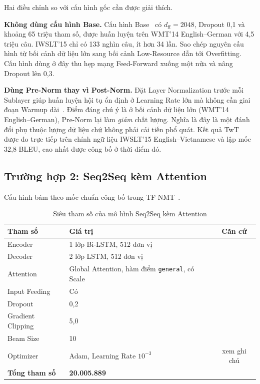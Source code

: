 \documentclass[11pt,a4paper]{article}
\newcommand{\file}[1]{\texttt{\small #1}}
\begin{document}
Hai điều chỉnh so với cấu hình gốc cần được giải thích.

\textbf{Không dùng cấu hình Base.} Cấu hình Base~\cite{vaswani2017} có
$d_{\text{ff}} = 2048$, Dropout 0,1 và khoảng 65 triệu tham số, được huấn luyện
trên WMT'14 English--German với 4,5 triệu câu. IWSLT'15 chỉ có 133 nghìn câu, ít
hơn 34 lần. Sao chép nguyên cấu hình từ bối cảnh dữ liệu lớn sang bối cảnh
Low-Resource dẫn tới Overfitting. Cấu hình dùng ở đây thu hẹp mạng Feed-Forward
xuống một nửa và nâng Dropout lên 0,3.

\textbf{Dùng Pre-Norm thay vì Post-Norm.} Đặt Layer Normalization trước mỗi
Sublayer giúp huấn luyện hội tụ ổn định ở Learning Rate lớn mà không cần giai
đoạn Warmup dài~\cite{nguyen2019}. Điểm đáng chú ý là ở bối cảnh dữ liệu lớn
(WMT'14 English--German), Pre-Norm lại làm \emph{giảm} chất lượng. Nghĩa là đây
là một đánh đổi phụ thuộc lượng dữ liệu chứ không phải cải tiến phổ quát. Kết
quả TwT~\cite{nguyen2019} được đo trực tiếp trên chính ngữ liệu IWSLT'15
English--Vietnamese và lập mốc 32,8 BLEU, cao nhất được công bố ở thời điểm đó.

\subsection{Trường hợp 2: Seq2Seq kèm Attention}

Cấu hình bám theo mốc chuẩn công bố trong TF-NMT~\cite{tfnmt}.

\begin{table}[H]
\centering
\small
\caption{Siêu tham số của mô hình Seq2Seq kèm Attention}
\label{tab:cfg-s2s}
\begin{tabular}{llc}
\toprule
\textbf{Tham số} & \textbf{Giá trị} & \textbf{Căn cứ} \\
\midrule
Encoder        & 1 lớp Bi-LSTM, 512 đơn vị          & \cite{tfnmt} \\
Decoder        & 2 lớp LSTM, 512 đơn vị             & \cite{tfnmt} \\
Attention      & Global Attention, hàm điểm \file{general}, có Scale & \cite{luong2015emnlp,tfnmt} \\
Input Feeding  & Có                                 & \cite{luong2015emnlp} \\
Dropout        & 0,2                                & \cite{tfnmt} \\
Gradient Clipping & 5,0                             & \cite{tfnmt} \\
Beam Size      & 10                                 & \cite{tfnmt} \\
Optimizer      & Adam, Learning Rate $10^{-3}$      & xem ghi chú \\
\midrule
\textbf{Tổng tham số} & \textbf{20.005.889}          & \\
\bottomrule
\end{tabular}
\end{table}
\end{document}
